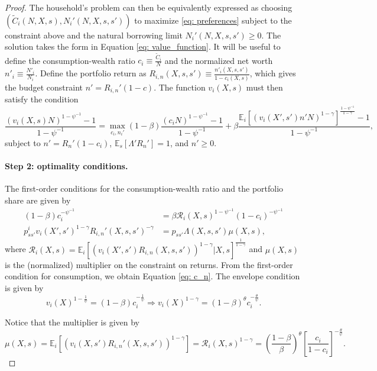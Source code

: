 \begin{proof}
The household's problem can then be equivalently expressed as choosing $(\tilde{C}_i(N, X,s),N_i'(N,X,s,s') )$ to maximize \eqref{eq: preferences} subject to the constraint above and the natural borrowing limit $N_i'(N,X,s,s') \geq 0$. The solution takes the form in Equation \eqref{eq: value_function}.  It will be useful to define the consumption-wealth ratio $c_i \equiv \frac{\tilde{C}_i}{N}$ and the normalized net worth $n'_i \equiv \frac{N'_i}{N_i}$. Define the portfolio return as $R_{i,n}(X,s,s') \equiv \frac{n'_i(X,s,s')}{1-c_i(X,s)} $, which gives the budget constraint $n' = R_{i,n}'(1-c)$. The function $v_i(X,s)$ must then satisfy the condition
\begin{equation}
    \frac{(v_i(X,s) N)^{1-\psi^{-1}}-1}{1-\psi^{-1}} = \max_{c_{i},n_{i}'}  (1-\beta) \frac{(c_i N)^{1-\psi^{-1}}-1}{1-\psi^{-1}} + \beta \frac{\mathbb{E}_i\left[ (v_i(X',s')n' N)^{1-\gamma}\right]^{\frac{1-\psi^{-1}}{1-\gamma}}-1}{1-\psi^{-1}},
\end{equation}
subject to $n' = R_n'(1-c_i) $, $\mathbb{E}_s[\Lambda' R_n'] = 1$, and $n'\geq 0$. 

\paragraph{Step 2: optimality conditions.} The first-order conditions for the consumption-wealth ratio and the portfolio share are given by 
\begin{align}
    (1-\beta) c_i^{-\psi^{-1}} &= \beta \mathcal{R}_i(X,s)^{1-\psi^{-1}} (1-c_i)^{-\psi^{-1}}\\
    p_{ss'}^i v_i(X',s')^{1-\gamma} R_{i,n}'(X,s,s')^{-\gamma} & = p_{ss'}\Lambda(X,s,s') \mu(X,s),
\end{align}
where $\mathcal{R}_i(X,s) = \mathbb{E}_i\left[ (v_i(X',s') R_{i,n}(X,s,s'))^{1-\gamma} |X,s\right]^{\frac{1}{1-\gamma}}$ and
$\mu(X,s)$ is the (normalized) multiplier on the constraint on returns. From the first-order condition for consumption, we obtain Equation \eqref{eq: c_n}. The envelope condition is given by
\begin{equation}
     v_i(X)^{1-\frac{1}{\psi}} = (1-\beta) c_i^{-\frac{1}{\psi}} \Rightarrow v_i(X)^{1-\gamma} = (1-\beta)^\theta c_i^{-\frac{\theta}{\psi}}.
\end{equation}

Notice that the multiplier is given by
\begin{equation}
    \mu(X,s) = \mathbb{E}_i[ (v_i(X,s') R_{i,n}'(X,s,s'))^{1-\gamma} ] =  \mathcal{R}_{i}(X,s)^{1-\gamma} = \left( \frac{1-\beta}{\beta} \right)^\theta \left[ \frac{c_i}{1-c_i} \right]^{-\frac{\theta}{\psi}}.
\end{equation}


\end{proof}
